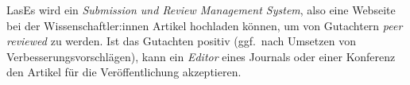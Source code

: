
LasEs wird ein \emph{Submission und Review Management System}, also eine Webseite bei der Wissenschaftler:innen Artikel hochladen können, um von Gutachtern \emph{peer reviewed} zu werden.
Ist das Gutachten positiv (ggf.\ nach Umsetzen von Verbesserungsvorschlägen), kann ein \emph{Editor} eines Journals oder einer Konferenz den Artikel für die Veröffentlichung akzeptieren.
